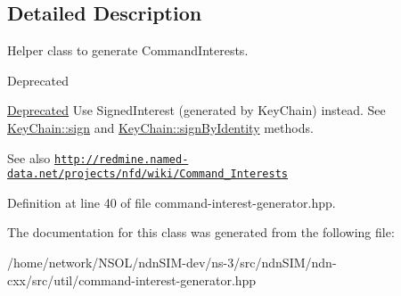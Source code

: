 \subsection{Detailed Description}
Helper class to generate Command\+Interests. 

\begin{DoxyRefDesc}{Deprecated}
\item[\hyperlink{deprecated__deprecated000042}{Deprecated}]Use Signed\+Interest (generated by Key\+Chain) instead. See \hyperlink{classndn_1_1security_1_1KeyChain_a787253e1e20d5c836e0eb8726285c484}{Key\+Chain\+::sign} and \hyperlink{classndn_1_1security_1_1KeyChain_a12667fcdf3bef2250eb3b523b1e4f987}{Key\+Chain\+::sign\+By\+Identity} methods.\end{DoxyRefDesc}


\begin{DoxySeeAlso}{See also}
\href{http://redmine.named-data.net/projects/nfd/wiki/Command_Interests}{\tt http\+://redmine.\+named-\/data.\+net/projects/nfd/wiki/\+Command\+\_\+\+Interests} 
\end{DoxySeeAlso}


Definition at line 40 of file command-\/interest-\/generator.\+hpp.



The documentation for this class was generated from the following file\+:\begin{DoxyCompactItemize}
\item 
/home/network/\+N\+S\+O\+L/ndn\+S\+I\+M-\/dev/ns-\/3/src/ndn\+S\+I\+M/ndn-\/cxx/src/util/command-\/interest-\/generator.\+hpp\end{DoxyCompactItemize}
